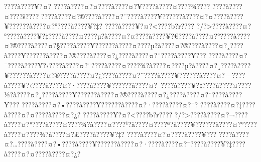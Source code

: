 \documentclass[11pt, openany]{book}
\begin{document}
???\textbar{}?à???\textbar{}?¥?¤?
???\textbar{}?à???\textbar{}?¤?¤???\textbar{}?à???\textbar{}?¤?¥???\textbar{}?à???\textbar{}?¤???\textbar{}?¾???\textbar{}?
???\textbar{}?à???\textbar{}?¤???\textbar{}?š???\textbar{}?
???\textbar{}?à???\textbar{}?¤?®???\textbar{}?à???\textbar{}?¤?¨???\textbar{}?à???\textbar{}?¥?????\textbar{}?à???\textbar{}?¤?¤???\textbar{}?à???\textbar{}?¥?????\textbar{}?à???\textbar{}?¤?°???\textbar{}?à???\textbar{}?¥?‡?
???\textbar{}?à???\textbar{}?¥?¤?\textless{}???\textbar{}?b?r???\textbar{}?
?/?\textgreater{}???\textbar{}?à???\textbar{}?¤?°???\textbar{}?à???\textbar{}?¥?‡???\textbar{}?à???\textbar{}?¤???\textbar{}?µ?à???\textbar{}?¤?¤???\textbar{}?à???\textbar{}?¥?€???\textbar{}?à???\textbar{}?¤?°???\textbar{}?à???\textbar{}?¤?®???\textbar{}?à???\textbar{}?¤?§???\textbar{}?à???\textbar{}?¥?????\textbar{}?à???\textbar{}?¤???\textbar{}?µ?à???\textbar{}?¤?®???\textbar{}?à???\textbar{}?¤?¸???\textbar{}?à???\textbar{}?¥?????\textbar{}?à???\textbar{}?¤?®???\textbar{}?à???\textbar{}?¤?¿???\textbar{}?à???\textbar{}?¤?¨???\textbar{}?à???\textbar{}?¥???
???\textbar{}?à???\textbar{}?¤?¯???\textbar{}?à???\textbar{}?¥?‹???\textbar{}?à???\textbar{}?¤?¨???\textbar{}?à???\textbar{}?¤???\textbar{}?¾?à???\textbar{}?¤???\textbar{}?µ?à???\textbar{}?¤?¸???\textbar{}?à???\textbar{}?¥?????\textbar{}?à???\textbar{}?¤?®???\textbar{}?à???\textbar{}?¤?¿???\textbar{}?à???\textbar{}?¤?¨???\textbar{}?à???\textbar{}?¥?????\textbar{}?à???\textbar{}?¤?---???\textbar{}?à???\textbar{}?¥?‹???\textbar{}?à???\textbar{}?¤?·???\textbar{}?à???\textbar{}?¥?????\textbar{}?à???\textbar{}?¤?~???\textbar{}?à???\textbar{}?¥?‡???\textbar{}?à???\textbar{}?¤???\textbar{}?½?à???\textbar{}?¤?¸???\textbar{}?à???\textbar{}?¥?????\textbar{}?à???\textbar{}?¤?®???\textbar{}?à???\textbar{}?¤?¿???\textbar{}?à???\textbar{}?¤?¨???\textbar{}?à???\textbar{}?¥???
???\textbar{}?à???\textbar{}?¤?•???\textbar{}?à???\textbar{}?¥?????\textbar{}?à???\textbar{}?¤?·???\textbar{}?à???\textbar{}?¤?¯?
???\textbar{}?à???\textbar{}?¤?‡???\textbar{}?à???\textbar{}?¤?¤???\textbar{}?à???\textbar{}?¤?¿?
???\textbar{}?à???\textbar{}?¥?¤?\textless{}???\textbar{}?b?r???\textbar{}?
?/?\textgreater{}???\textbar{}?à???\textbar{}?¤?¬???\textbar{}?à???\textbar{}?¤?°???\textbar{}?à???\textbar{}?¤???\textbar{}?¾?à???\textbar{}?¤???\textbar{}?¹?à???\textbar{}?¤???\textbar{}?ª?à???\textbar{}?¥?????\textbar{}?à???\textbar{}?¤?°???\textbar{}?à???\textbar{}?¤???\textbar{}?¾?à???\textbar{}?¤?£???\textbar{}?à???\textbar{}?¥?‡?
???\textbar{}?à???\textbar{}?¤?¤???\textbar{}?à???\textbar{}?¥???
???\textbar{}?à???\textbar{}?¤?\ldots{}???\textbar{}?à???\textbar{}?¤?•???\textbar{}?à???\textbar{}?¥?????\textbar{}?à???\textbar{}?¤?·???\textbar{}?à???\textbar{}?¤?¯???\textbar{}?à???\textbar{}?¥?‡???\textbar{}?à???\textbar{}?¤?¤???\textbar{}?à???\textbar{}?¤?¿?
\end{document}

